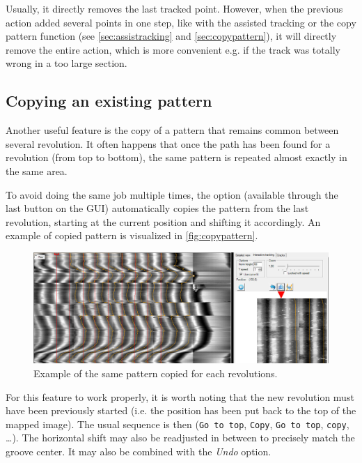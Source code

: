 Usually, it directly removes the last tracked point. However, when the previous action added several points in one step, like with the assisted tracking or the copy pattern function (see \autoref{sec:assistracking} and \autoref{sec:copypattern}), it will directly remove the entire action, which is more convenient e.g. if the track was totally wrong in a too large section.

\subsection{Copying an existing pattern}
\label{sec:copypattern}

Another useful feature is the copy of a pattern that remains common between several revolution. It often happens that once the path has been found for a revolution (from top to bottom), the same pattern is repeated almost exactly in the same area.

To avoid doing the same job multiple times, the option (available through the last button on the GUI) automatically copies the pattern from the last revolution, starting at the current position and shifting it accordingly. An example of copied pattern is visualized in \autoref{fig:copypattern}.

\begin{figure}[!ht]
\centering
\includegraphics[width=1.0\textwidth]{images/int-copy-pattern}
\caption{Example of the same pattern copied for each revolutions.}
\label{fig:copypattern}
\end{figure}

For this feature to work properly, it is worth noting that the new revolution must have been previously started (i.e. the position has been put back to the top of the mapped image). The usual sequence is then (\texttt{Go to top}, \texttt{Copy}, \texttt{Go to top}, \texttt{copy}, \dots ). The horizontal shift may also be readjusted in between to precisely match the groove center. It may also be combined with the \emph{Undo} option.

